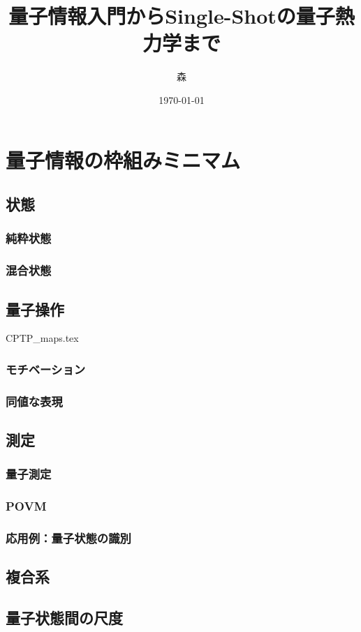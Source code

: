 \documentclass[report]{jlreq}
\title{量子情報入門からSingle-Shotの量子熱力学まで}
\author{森}
\date{\today}
\begin{document}
\maketitle

\setcounter{tocdepth}{1}
\thispagestyle{TOC}
\tableofcontents

\chapter{量子情報の枠組みミニマム}
\section{状態}
\subsection{純粋状態}
\subsection{混合状態}
\section{量子操作}
{CPTP_maps.tex}
\subsection{モチベーション}
\subsection{同値な表現}
\section{測定}
\subsection{量子測定}
\subsection{POVM}
\subsection{応用例：量子状態の識別}
\section{複合系}
\section{量子状態間の尺度}
\end{document}
